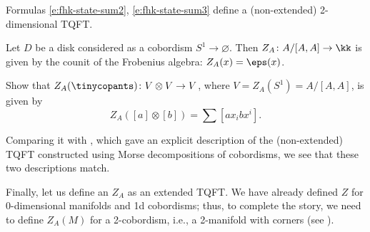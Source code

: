 \begin{theorem}\label{t:latticeTQFT}
  Formulas \eqref{e:fhk-state-sum2}, \eqref{e:fhk-state-sum3} define a
  (non-extended) 2-dimen\-sional TQFT.
\end{theorem}

\begin{example}\label{x:lattice-disk}
  Let $D$ be a disk considered as a cobordism $S^1\to\varnothing$. Then
  $Z_A\colon A/[A,A]\to \kk$ is given by the counit of the Frobenius algebra:
  $Z_A(x)=\eps(x)$.
\end{example}
\begin{exercise}\label{ec:lattice-pants}
  Show that $Z_A(\tinycopants)\colon V\otimes V\to V$, where $V=Z_A(S^1)=A/[A,A]$,
  is given by
  $$
    Z_A([a]\otimes[b])=\sum [a x_i b x^i].
  $$
\end{exercise}

Comparing it with , which gave an explicit description of
the (non-extended) TQFT constructed using Morse decompositions of cobordisms,
we see that these two descriptions match.


Finally, let us define an $Z_A$ as an extended TQFT. We have already defined
$Z$ for 0-dimensional manifolds and 1d cobordisms; thus, to complete the story,
we need to define $Z_A(M)$ for a 2-cobordism, i.e., a 2-manifold with corners
(see ).

